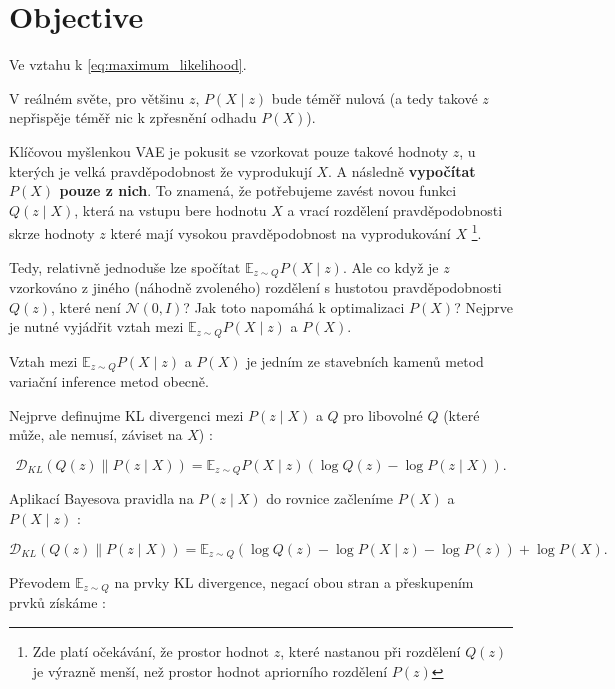 \section{Objective}

Ve vztahu k \autoref{eq:maximum_likelihood}.

V reálném světe, pro většinu $z$, $P(X\mid z)$ bude téměř nulová (a tedy takové $z$ nepřispěje téměř nic k zpřesnění odhadu $P(X)$). \cite{Doersch2021}

Klíčovou myšlenkou VAE je pokusit se vzorkovat pouze takové hodnoty $z$, u kterých je velká pravděpodobnost že vyprodukují $X$. A následně \textbf{vypočítat $P(X)$ pouze z nich}.
To znamená, že potřebujeme zavést novou funkci $Q(z\mid X)$, která na vstupu bere hodnotu $X$ a vrací rozdělení pravděpodobnosti skrze hodnoty $z$ které mají vysokou pravděpodobnost na vyprodukování $X$ \footnote{Zde platí očekávání, že prostor hodnot $z$, které nastanou při rozdělení $Q(z)$ je výrazně menší, než prostor hodnot apriorního rozdělení $P(z)$}. \cite{Doersch2021}

Tedy, relativně jednoduše lze spočítat $\mathds{E}_{z \sim Q}P(X \mid z)$. Ale co když je $z$ vzorkováno z jiného (náhodně zvoleného) rozdělení s hustotou pravděpodobnosti $Q(z)$, které není $\mathcal{N}(0, I)$? Jak toto napomáhá k optimalizaci $P(X)$? Nejprve je nutné vyjádřit vztah mezi $\mathds{E}_{z \sim Q}P(X\mid z)$ a $P(X)$. \cite{Doersch2021}

Vztah mezi $\mathds{E}_{z \sim Q}P(X \mid z)$ a $P(X)$ je jedním ze stavebních kamenů metod variační inference metod obecně. \cite{Doersch2021}

Nejprve definujme KL divergenci mezi $P(z\mid X)$ a $Q$ pro libovolné $Q$ (které může, ale nemusí, záviset na $X$) \cite{Doersch2021}:

\begin{equation}
    \mathcal{D}_{KL}(Q(z) \parallel P(z\mid X)) = \mathds{E}_{z \sim Q}P(X \mid z)(\log Q(z) - \log P(z\mid X)).
\end{equation}

Aplikací Bayesova pravidla na $P(z \mid X)$ do rovnice začleníme $P(X)$ a $P(X \mid z)$ \cite{Doersch2021}:

\begin{equation}
    \mathcal{D}_{KL}(Q(z)\parallel P(z\mid X)) = \mathds{E}_{z \sim Q}(\log Q(z) - \log P(X \mid z) - \log P(z)) + \log P(X).
\end{equation}

Převodem $\mathds{E}_{z \sim Q}$ na prvky KL divergence, negací obou stran a přeskupením prvků získáme \cite{Doersch2021}:


